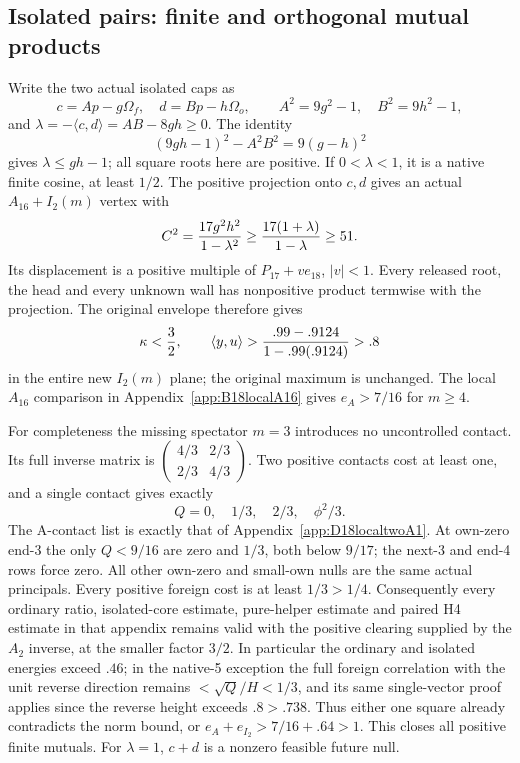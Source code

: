 \documentclass[11pt]{article}
\theoremstyle{definition}
\theoremstyle{remark}
\newcommand{\ip}[2]{\langle #1,#2\rangle}
\begin{document}
\subsection{Isolated pairs: finite and orthogonal mutual products}
\label{app:D18isolatedfinite}

Write the two actual isolated caps as
\[
 c=Ap-g\Omega_f,\quad d=Bp-h\Omega_o,\qquad
 A^2=9g^2-1,\quad B^2=9h^2-1,
\]
and \(\lambda=-\ip cd=AB-8gh\ge0\).
The identity
\[
 (9gh-1)^2-A^2B^2=9(g-h)^2
\]
gives \(\lambda\le gh-1\); all square roots here are positive.
If \(0<\lambda<1\), it is a native finite cosine, at least \(1/2\).
The positive projection onto \(c,d\) gives an actual
\(A_{16}+I_2(m)\) vertex with
\[
 C^2={17g^2h^2\over1-\lambda^2}
 \ge {17(1+\lambda)\over1-\lambda}\ge51.
\]
Its displacement is a positive multiple of
\(P_{17}+ve_{18}\), \(|v|<1\).
Every released root, the head and every unknown wall has
nonpositive product termwise with the projection.
The original envelope therefore gives
\[
 \kappa<{3\over2},\qquad
 \ip yu>{.99-.9124\over1-.99(.9124)}>.8
\]
in the entire new \(I_2(m)\) plane; the original maximum is
unchanged.  The local \(A_{16}\) comparison in
Appendix~\ref{app:B18localA16} gives \(e_A>7/16\) for \(m\ge4\).

For completeness the missing spectator \(m=3\) introduces no
uncontrolled contact.  Its full inverse matrix is
\(\left(\begin{smallmatrix}4/3&2/3\\2/3&4/3\end{smallmatrix}\right)\).
Two positive contacts cost at least one, and a single contact gives
exactly
\[
                  Q=0,\quad1/3,\quad2/3,\quad\phi^2/3 .
\]
The A-contact list is exactly that of
Appendix~\ref{app:D18localtwoA1}.
At own-zero end-3 the only \(Q<9/16\) are zero and \(1/3\),
both below \(9/17\); the next-3 and end-4 rows force zero.
All other own-zero and small-own nulls are the same actual principals.
Every positive foreign cost is at least \(1/3>1/4\).
Consequently every ordinary ratio, isolated-core estimate,
pure-helper estimate and paired H4 estimate in that appendix
remains valid with the positive clearing supplied by the
\(A_2\) inverse, at the smaller factor \(3/2\).
In particular the ordinary and isolated energies exceed \(.46\);
in the native-5 exception the full foreign correlation with the
unit reverse direction remains \(<\sqrt Q/H<1/3\),
and its same single-vector proof applies since the reverse height
exceeds \(.8>.738\).
Thus either one square already contradicts the norm bound, or
\(e_A+e_{I_2}>7/16+.64>1\).
This closes all positive finite mutuals.
For \(\lambda=1\), \(c+d\) is a nonzero feasible future null.
\end{document}

